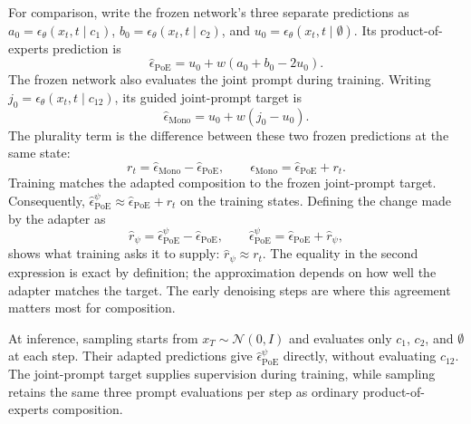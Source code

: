 \documentclass{article} %
\begin{document}
For comparison, write the frozen network's three separate predictions as
$a_0=\epsilon_\theta(x_t,t\mid c_1)$, $b_0=\epsilon_\theta(x_t,t\mid c_2)$, and
$u_0=\epsilon_\theta(x_t,t\mid\emptyset)$. Its product-of-experts prediction is
\begin{equation}
\hat\epsilon_{\mathrm{PoE}}=u_0+w(a_0+b_0-2u_0).
\end{equation}
The frozen network also evaluates the joint prompt during training. Writing
$j_0=\epsilon_\theta(x_t,t\mid c_{12})$, its guided joint-prompt target is
\begin{equation}
\hat\epsilon_{\mathrm{Mono}}=u_0+w(j_0-u_0).
\end{equation}
The plurality term is the difference between these two frozen predictions at the same state:
\begin{equation}
r_t=\hat\epsilon_{\mathrm{Mono}}-\hat\epsilon_{\mathrm{PoE}},
\qquad
\hat\epsilon_{\mathrm{Mono}}=\hat\epsilon_{\mathrm{PoE}}+r_t.
\end{equation}
Training matches the adapted composition to the frozen joint-prompt target. Consequently,
$\hat\epsilon^{\psi}_{\mathrm{PoE}}\approx\hat\epsilon_{\mathrm{PoE}}+r_t$ on the
training states. Defining the change made by the adapter as
\begin{equation}
\hat r_\psi
  =\hat\epsilon^{\psi}_{\mathrm{PoE}}-\hat\epsilon_{\mathrm{PoE}},
\qquad
\hat\epsilon^{\psi}_{\mathrm{PoE}}
  =\hat\epsilon_{\mathrm{PoE}}+\hat r_\psi,
\end{equation}
shows what training asks it to supply: $\hat r_\psi\approx r_t$. The equality in the
second expression is exact by definition; the approximation depends on how well the adapter
matches the target. The early denoising steps are where this agreement matters most for
composition.

At inference, sampling starts from $x_T\sim\mathcal N(0,I)$ and evaluates only $c_1$,
$c_2$, and $\emptyset$ at each step. Their adapted predictions give
$\hat\epsilon^{\psi}_{\mathrm{PoE}}$ directly, without evaluating $c_{12}$. The
joint-prompt target supplies supervision during training, while sampling retains the same
three prompt evaluations per step as ordinary product-of-experts composition.


\end{document}

